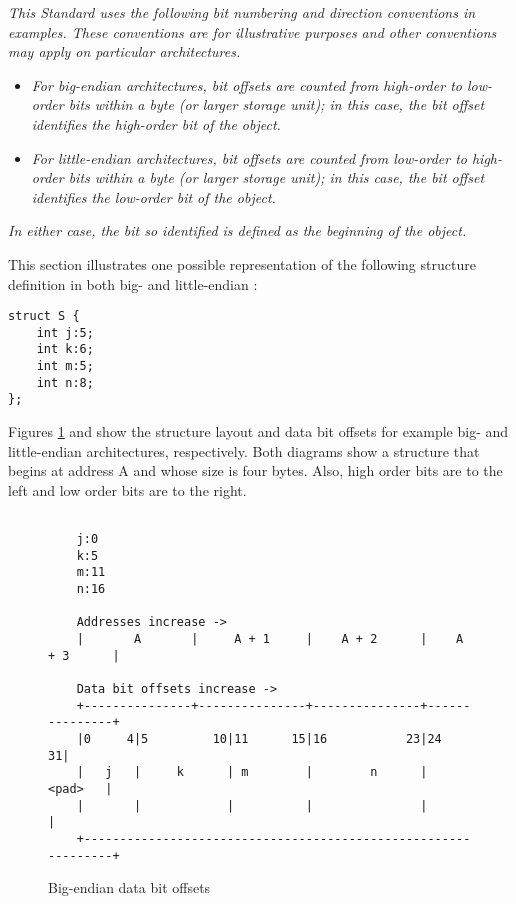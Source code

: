 \textit{This Standard uses the following bit numbering and direction
conventions in examples. These conventions are for illustrative
purposes and other conventions may apply on particular
architectures.}
\begin{itemize}
\item \textit{For big-endian architectures, bit offsets are
counted from high-order to low-order bits within a byte (or
larger storage unit); in this case, the bit offset identifies
the high-order bit of the object.}

\item \textit{For little-endian architectures, bit offsets are
counted from low-order to high-order bits within a byte (or
larger storage unit); in this case, the bit offset identifies
the low-order bit of the object.}
\end{itemize}

\textit{In either case, the bit so identified is defined as the 
beginning of the object.}

This section illustrates one possible representation of the 
following  structure definition in both big- 
and little-endian :

\begin{lstlisting}
struct S {
    int j:5;
    int k:6;
    int m:5;
    int n:8;
};
\end{lstlisting}

Figures \ref{fig:bigendiandatabitoffsets} and
show the structure layout
and data bit offsets for example big- and little-endian
architectures, respectively. Both diagrams show a structure
that begins at address A and whose size is four bytes. Also,
high order bits are to the left and low order bits are to
the right.

\begin{figure}[h]
\begin{dwflisting}
\begin{verbatim}

    j:0
    k:5
    m:11
    n:16

    Addresses increase ->
    |       A       |     A + 1     |    A + 2      |    A + 3      | 

    Data bit offsets increase ->
    +---------------+---------------+---------------+---------------+
    |0     4|5         10|11      15|16           23|24           31|
    |   j   |     k      | m        |        n      |       <pad>   |
    |       |            |          |               |               | 
    +---------------------------------------------------------------+ 

\end{verbatim}
\end{dwflisting}
\caption{Big-endian data bit offsets}
\label{fig:bigendiandatabitoffsets}
\end{figure}

